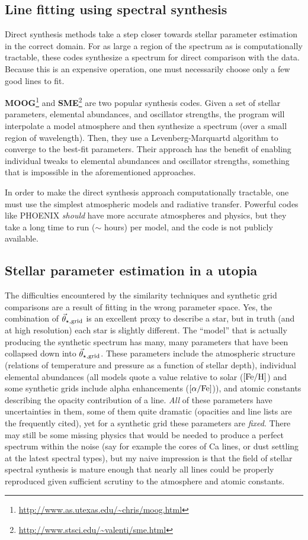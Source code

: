 \documentclass[preprint]{aastex} %
\newcommand{\vt}{\vec{\theta}}
\newcommand{\vg}{\vt_{\star, {\rm grid}}}
\newcommand{\Z}{[{\rm Fe}/{\rm H}]}
\newcommand{\A}{[\alpha/{\rm Fe}]}
\begin{document}
\subsection{Line fitting using spectral synthesis}
Direct synthesis methods take a step closer towards stellar parameter estimation in the correct domain. For as large a region of the spectrum as is computationally tractable, these codes synthesize a spectrum for direct comparison with the data. Because this is an expensive operation, one must necessarily choose only a few good lines to fit. 

\textbf{MOOG}\footnote{\url{http://www.as.utexas.edu/~chris/moog.html}} \citep{sne73} and \textbf{SME}\footnote{\url{http://www.stsci.edu/~valenti/sme.html}} \citep{vp96} are two popular synthesis codes. Given a set of stellar parameters, elemental abundances, and oscillator strengths, the program will interpolate a model atmosphere and then synthesize a spectrum (over a small region of wavelength). Then, they use a Levenberg-Marquartd algorithm to converge to the best-fit parameters. Their approach has the benefit of enabling individual tweaks to elemental abundances and oscillator strengths, something that is impossible in the aforementioned approaches.

In order to make the direct synthesis approach computationally tractable, one must use the simplest atmospheric models and radiative transfer. Powerful codes like PHOENIX \citep{hwd+13} \emph{should} have more accurate atmospheres and physics, but they take a long time to run ($\sim$ hours) per model, and the code is not publicly available. 

\subsection{Stellar parameter estimation in a utopia}
The difficulties encountered by the similarity techniques and synthetic grid comparisons are a result of fitting in the wrong parameter space. Yes, the combination of $\vg$ is an excellent proxy to describe a star, but in truth (and at high resolution) each star is slightly different. The ``model'' that is actually producing the synthetic spectrum has many, many parameters that have been collapsed down into $\vg$. These parameters include the atmospheric structure (relations of temperature and pressure as a function of stellar depth), individual elemental abundances (all models quote a value relative to solar ($\Z$) and some synthetic grids include alpha enhancements ($\A$)), and atomic constants describing the opacity contribution of a line. \emph{All} of these parameters have uncertainties in them, some of them quite dramatic (opacities and line lists are the frequently cited), yet for a synthetic grid these parameters are \emph{fixed}. There may still be some missing physics that would be needed to produce a perfect spectrum within the noise (say for example the cores of Ca lines, or dust settling at the latest spectral types), but my naive impression is that the field of stellar spectral synthesis is mature enough that nearly all lines could be properly reproduced given sufficient scrutiny to the atmosphere and atomic constants. 
\end{document}
